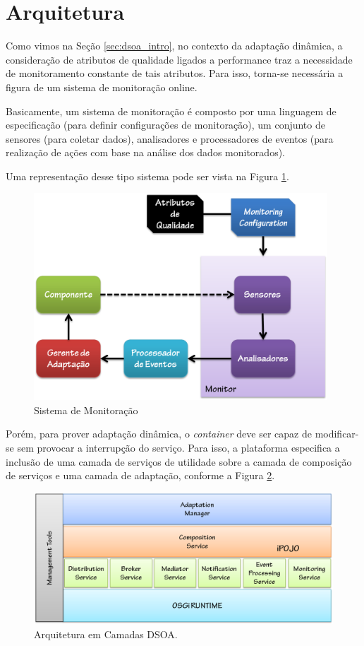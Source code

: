 \section{Arquitetura}
\label{sec:dsoa_arch}

Como vimos na Seção \ref{sec:dsoa_intro}, no contexto da adaptação dinâmica, a consideração de atributos de qualidade ligados a performance traz a necessidade de monitoramento constante de tais atributos. Para isso, torna-se necessária a figura de um sistema de monitoração online.

Basicamente, um sistema de monitoração é composto por uma linguagem de especificação (para definir configurações de monitoração), um conjunto de sensores (para coletar dados), analisadores e processadores de eventos (para realização de ações com base na análise dos dados monitorados). 

Uma representação desse tipo sistema pode ser vista na Figura \ref{fig:monitor}.


\begin{figure}[htp]
\centering
\includegraphics[width=11cm]{chapters/chapter3/monitor.png}
\caption{Sistema de Monitoração}
\label{fig:monitor}
\end{figure}

Porém, para prover adaptação dinâmica, o \textit{container} deve ser capaz de modificar-se sem provocar a interrupção do serviço. Para isso, a plataforma especifica a inclusão de uma camada de serviços de utilidade sobre a camada de composição de serviços e uma camada de adaptação, conforme a Figura \ref{fig:dsoa_arch}.

\begin{figure}[htp]
\centering
\includegraphics[width=13cm]{chapters/chapter3/dsoa-arch.png}
\caption[Arquitetura em Camadas DSOA]{Arquitetura em Camadas DSOA.}
\label{fig:dsoa_arch}
\end{figure}

